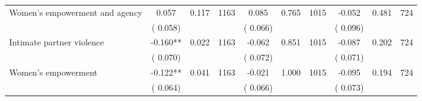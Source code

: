 \begin{tabular}{l*{9}{c}}
 Women's empowerment and agency                &              0.057        &        0.117 & 1163        &              0.085 &        0.765 & 1015               &       -0.052 &        0.481 & 724       \\ 
                               &        (       0.058) & &                                                                &       (       0.066) & &                                                         &       (       0.096) & & \\ 
 Intimate partner violence                &             -0.160**        &        0.022 & 1163        &             -0.062 &        0.851 & 1015               &       -0.087 &        0.202 & 724       \\ 
                               &        (       0.070) & &                                                                &       (       0.072) & &                                                         &       (       0.071) & & \\ 
 Women's empowerment                &             -0.122**        &        0.041 & 1163        &             -0.021 &        1.000 & 1015               &       -0.095 &        0.194 & 724       \\ 
                               &        (       0.064) & &                                                                &       (       0.066) & &                                                         &       (       0.073) & & \\ 
\hline \end{tabular}                                                                                                                                                      